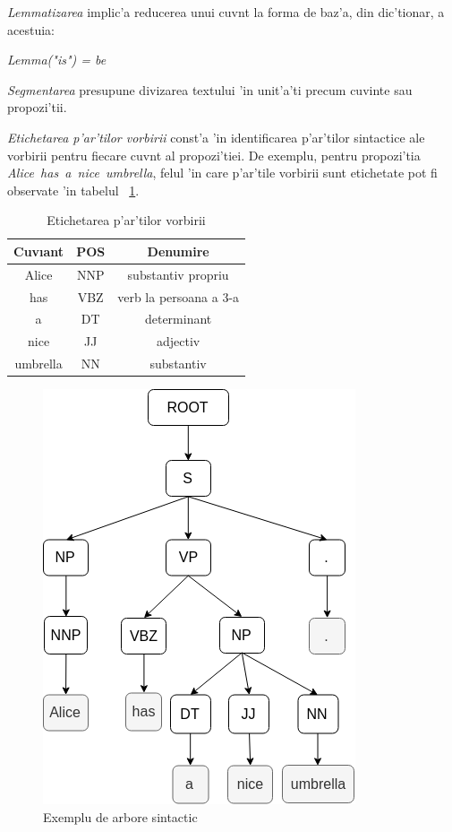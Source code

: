 \documentclass[12pt,a4paper,twoside]{report}
\begin{document}
{\it Lemmatizarea} implic'a reducerea unui cuv\ia nt la forma de baz'a, din dic'tionar, a acestuia: 

\begin{center}
{\it Lemma("is") = be}
\end{center}

{\it Segmentarea} presupune divizarea textului 'in unit'a'ti precum cuvinte sau propozi'tii. 

{\it Etichetarea p'ar'tilor vorbirii} const'a 'in identificarea p'ar'tilor sintactice ale vorbirii pentru fiecare cuv\ia nt al propozi'tiei. De exemplu, pentru propozi'tia {\it Alice\ has\ a\ nice\ umbrella}, felul 'in care p'ar'tile vorbirii sunt etichetate pot fi observate 'in tabelul ~\ref{table:pos_Tag}.


\begin{table}
\caption{Etichetarea p'ar'tilor vorbirii}
\centering                          %
\begin{tabular}{|c|c|c|}          %
\hline\hline                        %
Cuv\i ant& POS & Denumire\\ [0.5ex]   %
\hline                              %
Alice & NNP & substantiv propriu \\[1ex]    
has & VBZ & verb la persoana a 3-a \\[1ex]%
a & DT & determinant\\[1ex]
nice & JJ & adjectiv\\[1ex]
umbrella & NN & substantiv\\[1ex]
\hline                              
\end{tabular}
\label{table:pos_Tag} 
\end{table}


\begin{figure}
    \centering
    \includegraphics[width = 0.4\linewidth]{img/alice_parse.png}
        \caption{Exemplu de arbore sintactic}
    \label{fig:alice_parse}
\end{figure}
\end{document}
